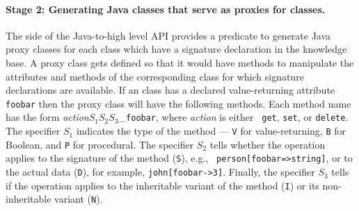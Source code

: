 \paragraph{Stage 2: Generating Java classes that serve as proxies for \FLORA classes.}
The \FLORA side of the Java-to-\FLORA high level API provides a predicate
to generate Java proxy classes for each \fl class which have a signature
declaration in the \FLORA knowledge base. A proxy class gets defined so
that it would have methods to manipulate the attributes and methods of the
corresponding \fl class for which signature declarations are available.  If
an \fl class has a declared value-returning attribute {\tt foobar} then the
proxy class will have the following methods. Each method name has the form
\emph{action}$S_1S_2S_3$\_{\tt foobar}, where \emph{action} is either {\tt
  get}, {\tt set}, or {\tt delete}. The specifier $S_1$ indicates the type
of the method --- {\tt V} for value-returning, {\tt B} for Boolean, and
{\tt P} for procedural. The specifier $S_2$ tells whether the operation
applies to the signature of the method ({\tt S}), e.g., {\tt
  person[foobar=>string]}, or to the actual data ({\tt D}), for example,
{\tt john[foobar->3]}.  Finally, the specifier $S_3$ tells if the operation
applies to the inheritable variant of the method ({\tt I})
or its non-inheritable variant ({\tt N}).
